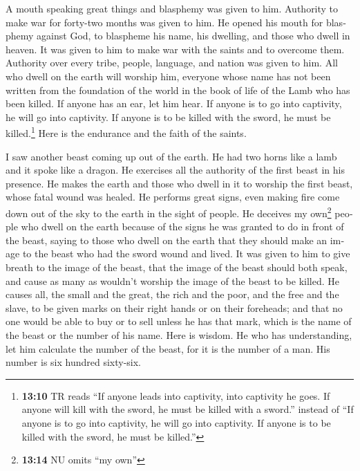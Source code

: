 \begin{paracol}{2}
\begin{otherlanguage}{english}
 A mouth speaking great things and blasphemy was given to
him. Authority to make war for forty-two months was given to him.
 He opened his mouth for blasphemy against God, to
blaspheme his name, his dwelling, and those who dwell in heaven.
 It was given to him to make war with the saints and to
overcome them. Authority over every tribe, people, language, and nation
was given to him.  All who dwell on the earth will worship
him, everyone whose name has not been written from the foundation of the
world in the book of life of the Lamb who has been killed.
 If anyone has an ear, let him hear.  If
anyone is to go into captivity, he will go into captivity. If anyone is
to be killed with the sword, he must be killed.\footnote{\textbf{13:10}
  TR reads ``If anyone leads into captivity, into captivity he goes. If
  anyone will kill with the sword, he must be killed with a sword.''
  instead of ``If anyone is to go into captivity, he will go into
  captivity. If anyone is to be killed with the sword, he must be
  killed.''} Here is the endurance and the faith of the saints.

 I saw another beast coming up out of the earth. He had
two horns like a lamb and it spoke like a dragon.  He
exercises all the authority of the first beast in his presence. He makes
the earth and those who dwell in it to worship the first beast, whose
fatal wound was healed.  He performs great signs, even
making fire come down out of the sky to the earth in the sight of
people.  He deceives my own\footnote{\textbf{13:14} NU
  omits ``my own''} people who dwell on the earth because of the signs
he was granted to do in front of the beast, saying to those who dwell on
the earth that they should make an image to the beast who had the sword
wound and lived.  It was given to him to give breath to
the image of the beast, that the image of the beast should both speak,
and cause as many as wouldn't worship the image of the beast to be
killed.  He causes all, the small and the great, the rich
and the poor, and the free and the slave, to be given marks on their
right hands or on their foreheads;  and that no one would
be able to buy or to sell unless he has that mark, which is the name of
the beast or the number of his name.  Here is wisdom. He
who has understanding, let him calculate the number of the beast, for it
is the number of a man. His number is six hundred sixty-six.


\end{otherlanguage}
\end{paracol}
